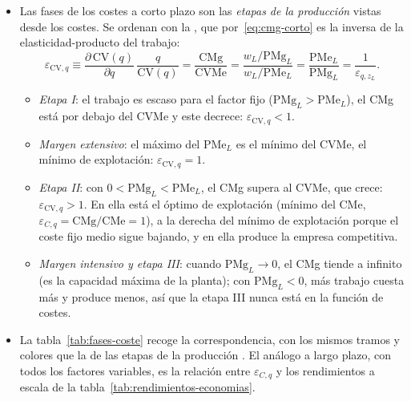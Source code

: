\documentclass[11pt]{article}
\begin{document}
\begin{itemize}
\item Las fases de los costes a corto plazo son las \emph{etapas de la producción}  vistas desde los costes. Se ordenan con la , que por~\eqref{eq:cmg-corto} es la inversa de la elasticidad-producto del trabajo:
  \begin{equation}
  \varepsilon_{\mathrm{CV},q}\equiv\frac{\partial\,\mathrm{CV}(q)}{\partial q}\,\frac{q}{\mathrm{CV}(q)}=\frac{\mathrm{CMg}}{\mathrm{CVMe}}=\frac{w_L/\mathrm{PMg}_L}{w_L/\mathrm{PMe}_L}=\frac{\mathrm{PMe}_L}{\mathrm{PMg}_L}=\frac{1}{\varepsilon_{q,z_L}}. \label{eq:elasticidad-cv}
  \end{equation}
  \begin{itemize}
  \item \emph{Etapa I}: el trabajo es escaso para el factor fijo ($\mathrm{PMg}_L>\mathrm{PMe}_L$), el CMg está por debajo del CVMe y este decrece: $\varepsilon_{\mathrm{CV},q}<1$.
  \item \emph{Margen extensivo}: el máximo del $\mathrm{PMe}_L$ es el mínimo del CVMe, el mínimo de explotación: $\varepsilon_{\mathrm{CV},q}=1$.
  \item \emph{Etapa II}: con $0<\mathrm{PMg}_L<\mathrm{PMe}_L$, el CMg supera al CVMe, que crece: $\varepsilon_{\mathrm{CV},q}>1$. En ella está el óptimo de explotación (mínimo del CMe, $\varepsilon_{C,q}=\mathrm{CMg}/\mathrm{CMe}=1$), a la derecha del mínimo de explotación porque el coste fijo medio sigue bajando, y en ella produce la empresa competitiva.
  \item \emph{Margen intensivo y etapa III}: cuando $\mathrm{PMg}_L\to 0$, el CMg tiende a infinito (es la capacidad máxima de la planta); con $\mathrm{PMg}_L<0$, más trabajo cuesta más y produce menos, así que la etapa III nunca está en la función de costes.
  \end{itemize}
\item La tabla~\ref{tab:fases-coste} recoge la correspondencia, con los mismos tramos y colores que la de las etapas de la producción . El análogo a largo plazo, con todos los factores variables, es la relación entre $\varepsilon_{C,q}$ y los rendimientos a escala de la tabla~\ref{tab:rendimientos-economias}.
\end{itemize}
\end{document}
